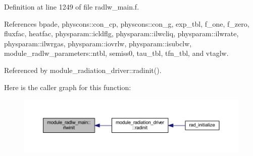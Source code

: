 Definition at line 1249 of file radlw\+\_\+main.\+f.



References bpade, physcons\+::con\+\_\+cp, physcons\+::con\+\_\+g, exp\+\_\+tbl, f\+\_\+one, f\+\_\+zero, fluxfac, heatfac, physparam\+::icldflg, physparam\+::ilwcliq, physparam\+::ilwrate, physparam\+::ilwrgas, physparam\+::iovrlw, physparam\+::isubclw, module\+\_\+radlw\+\_\+parameters\+::ntbl, semiss0, tau\+\_\+tbl, tfn\+\_\+tbl, and vtaglw.



Referenced by module\+\_\+radiation\+\_\+driver\+::radinit().



Here is the caller graph for this function\+:
\nopagebreak
\begin{figure}[H]
\begin{center}
\leavevmode
\includegraphics[width=350pt]{namespacemodule__radlw__main_ad1f036ae760a7e9dcbbdd93492617bb3_icgraph}
\end{center}
\end{figure}


